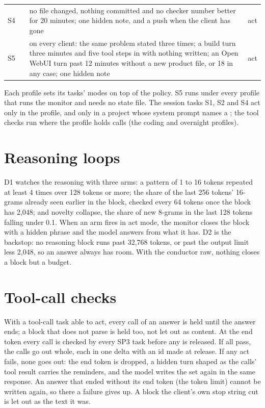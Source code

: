 \begin{table}[htbp]
\begin{tabularx}{\linewidth}{@{}L{.07\linewidth}L{.27\linewidth}YL{.08\linewidth}@{}}
S4 &  & no file changed, nothing committed and no checker number better for 20 minutes; one hidden note, and a push when the client has gone & act \\
S5 &  & on every client: the same problem stated three times; a build turn three minutes and five tool steps in with nothing written; an Open WebUI turn past 12 minutes without a new product file, or 18 in any case; one hidden note & act \\
\bottomrule
\end{tabularx}
\end{table}

Each profile sets its tasks' modes on top of the policy. S5 runs under every profile that runs the monitor and needs no state file. The session tasks S1, S2 and S4 act only in the  profile, and only in a project whose system prompt names a ; the tool checks run where the profile holds calls (the coding and overnight profiles).

\section{Reasoning loops}

D1 watches the reasoning with three arms: a pattern of 1 to 16 tokens repeated at least 4 times over 128 tokens or more; the share of the last 256 tokens' 16-grams already seen earlier in the block, checked every 64 tokens once the block has 2,048; and novelty collapse, the share of new 8-grams in the last 128 tokens falling under 0.1. When an arm fires in act mode, the monitor closes the block with a hidden phrase and the model answers from what it has. D2 is the backstop: no reasoning block runs past 32,768 tokens, or past the output limit less 2,048, so an answer always has room. With the conductor raw, nothing closes a block but a budget.

\section{Tool-call checks}

With a tool-call task able to act, every call of an answer is held until the answer ends; a block that does not parse is held too, not let out as content. At the end token every call is checked by every SP3 task before any is released. If all pass, the calls go out whole, each in one delta with an id made at release. If any act fails, none goes out: the end token is dropped, a hidden turn shaped as the calls' tool result carries the reminders, and the model writes the set again in the same response. An answer that ended without its end token (the token limit) cannot be written again, so there a failure gives up. A block the client's own stop string cut is let out as the text it was.

